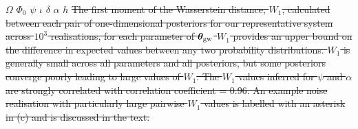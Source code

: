 \documentclass[fleqn,usenatbib,useAMS]{mnras}
\providecommand{\DIFdel}[1]{{\protect\color{red}\sout{#1}}}                      %
\providecommand{\DIFdelFL}[1]{\DIFdel{#1}} %
\providecommand{\DIFdelbeginFL}{} %
\newcommand{\DIFscaledelfig}{0.5}
\newlength{\DIFdelgraphicswidth} %
\newlength{\DIFdelgraphicsheight} %
\newcommand{\DIFdelincludegraphics}[2][]{%
\sbox{\DIFdelgraphicsbox}{\DIFOincludegraphics[#1]{#2}}%
\settoboxwidth{\DIFdelgraphicswidth}{\DIFdelgraphicsbox} %
\settoboxtotalheight{\DIFdelgraphicsheight}{\DIFdelgraphicsbox} %
\scalebox{\DIFscaledelfig}{%
\parbox[b]{\DIFdelgraphicswidth}{\usebox{\DIFdelgraphicsbox}\\[-\baselineskip] \rule{\DIFdelgraphicswidth}{0em}}\llap{\resizebox{\DIFdelgraphicswidth}{\DIFdelgraphicsheight}{%
\setlength{\unitlength}{\DIFdelgraphicswidth}%
\begin{picture}(1,1)%
\thicklines\linethickness{2pt} %
{\color[rgb]{1,0,0}\put(0,0){\framebox(1,1){}}}%
{\color[rgb]{1,0,0}\put(0,0){\line( 1,1){1}}}%
{\color[rgb]{1,0,0}\put(0,1){\line(1,-1){1}}}%
\end{picture}%
}\hspace*{3pt}}} %
} %
\DeclareRobustCommand{\DIFdelbeginFL}{\DIFOdelbeginFL \let\includegraphics\DIFdelincludegraphics} %
\begin{document}
\DIFdelbeginFL %
{%
\DIFdelFL{$\Omega$}}
{%
\DIFdelFL{$\Phi_0$}}
{%
\DIFdelFL{$\psi$}} %
{%
\DIFdelFL{$\iota$}}
{%
\DIFdelFL{$\delta$}}
{%
\DIFdelFL{$\alpha$}}
{%
\DIFdelFL{$h$}}
{%
\DIFdelFL{The first moment of the Wasserstein distance, $W_1$, calculated between each pair of one-dimensional posteriors for our representative system across $10^3$ realisations, for each parameter of $\boldsymbol{\theta}_{\rm gw}$  $W_1$ provides an upper bound on the difference in expected values between any two probability distributions. $W_1$ is generally small across all parameters and all posteriors, but some posteriors converge poorly leading to large values of $W_1$. The $W_1$ values inferred for $\psi$ and $\alpha$ are strongly correlated with correlation coefficient = 0.96. An example noise realisation with particularly large pairwise $W_1$ values is labelled with an asterisk in (c) and is discussed in the text.}} %
\end{document}
